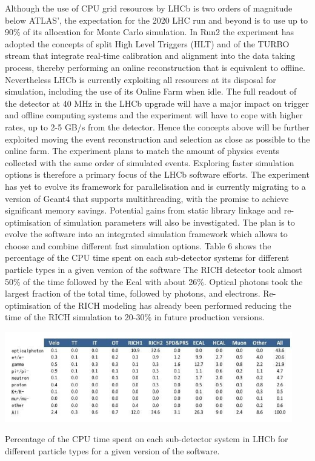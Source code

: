 \documentclass[12pt,a4paper]{article}
\begin{document}
{Although the use of CPU grid resources by LHCb is two orders of
magnitude below ATLAS', the expectation for the 2020 LHC run and beyond
is to use up to 90\% of its allocation for Monte Carlo simulation. In
Run2 the experiment has adopted the concepts of split High Level
Triggers (HLT) and of the TURBO stream that integrate real-time
calibration and alignment into the data taking process, thereby
performing an online reconstruction that is equivalent to offline.
Nevertheless LHCb is currently exploiting all resources at its disposal
for simulation, including the use of its Online Farm when idle. The full
readout of the detector at 40 MHz in the LHCb upgrade will have a major
impact on trigger and offline computing systems and the experiment will
have to cope with higher rates, up to 2-5 GB/s from the detector. Hence
the concepts above will be further exploited moving the event
reconstruction and selection as close as possible to the online farm.
The experiment plans to match the amount of physics events collected
with the same order of simulated events. Exploring faster simulation
options is therefore a primary focus of the LHCb software efforts. The
experiment has yet to evolve its framework for parallelisation and is
currently migrating to a version of Geant4 that supports multithreading,
with the promise to achieve significant memory savings. Potential gains
from static library linkage and re-optimisation of simulation parameters
will also be investigated. The plan is to evolve the software into an
integrated simulation framework which allows to choose and combine
different fast simulation options. Table 6 shows the percentage of the
CPU time spent on each sub-detector systems for different particle types
in a given version of the software The RICH detector took almost 50\% of
the time followed by the Ecal with about 26\%. Optical photons took the
largest fraction of the total time, followed by photons, and electrons.
Re-optimisation of the RICH modeling has already been performed reducing
the time of the RICH simulation to 20-30\% in future production
versions.

\begin{table}[bthp]
\vspace*{0.3cm}
\centering
\includegraphics[width=0.94\textwidth]{image18.png}
\caption{Percentage of the CPU time spent on each sub-detector
system in LHCb for different particle types for a given version of the
software.}
\label{table:table6}
\end{table}

}
\end{document}
